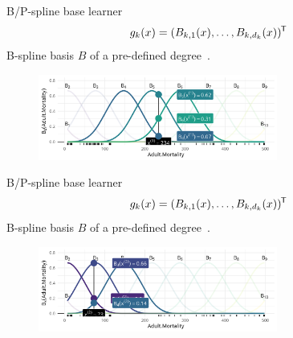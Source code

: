 
\begin{frame}{B/P-spline base learner}
  \vspace{-0.3cm}\[g_k(x) = (B_{k,1}(x), \dots, B_{k,d_k}(x))^{\mkern-1.5mu\mathsf{T}}\] B-spline basis $B$ of a pre-defined degree~\citep{eilers1996flexible}.
  \begin{center}
    \begin{figure}
      \includegraphics[width=0.7\textwidth]{figures/bs-base/fig-bs1.png}
    \end{figure}
  \end{center}
  \vspace{-0.3cm}
  
  
\end{frame}


\begin{frame}{B/P-spline base learner}
  \vspace{-0.3cm}\[g_k(x) = (B_{k,1}(x), \dots, B_{k,d_k}(x))^{\mkern-1.5mu\mathsf{T}}\] B-spline basis $B$ of a pre-defined degree~\citep{eilers1996flexible}.
  \begin{center}
    \begin{figure}
      \includegraphics[width=0.7\textwidth]{figures/bs-base/fig-bs59.png}
    \end{figure}
  \end{center}
  \vspace{-0.3cm}
  
  \addtocounter{framenumber}{-1}
\end{frame}


